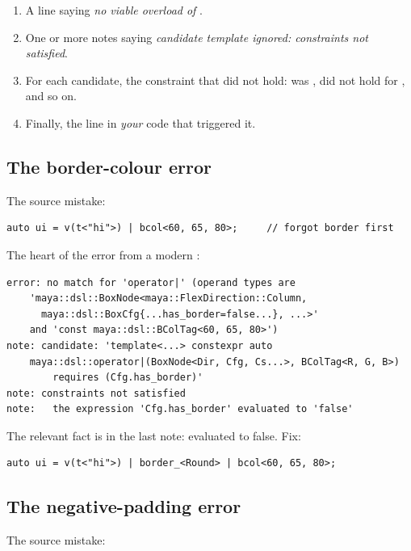 \begin{enumerate}[leftmargin=*]
  \item A line saying \emph{no viable overload of }.
  \item One or more notes saying \emph{candidate template ignored:
    constraints not satisfied}.
  \item For each candidate, the constraint that did not hold:
     was ,  did not
    hold for , and so on.
  \item Finally, the line in \emph{your} code that triggered it.
\end{enumerate}

\subsection{The border-colour error}

The source mistake:

\begin{lstlisting}
auto ui = v(t<"hi">) | bcol<60, 65, 80>;     // forgot border first
\end{lstlisting}

The heart of the error from a modern :

\begin{lstlisting}[style=shell]
error: no match for 'operator|' (operand types are
    'maya::dsl::BoxNode<maya::FlexDirection::Column,
      maya::dsl::BoxCfg{...has_border=false...}, ...>'
    and 'const maya::dsl::BColTag<60, 65, 80>')
note: candidate: 'template<...> constexpr auto
    maya::dsl::operator|(BoxNode<Dir, Cfg, Cs...>, BColTag<R, G, B>)
        requires (Cfg.has_border)'
note: constraints not satisfied
note:   the expression 'Cfg.has_border' evaluated to 'false'
\end{lstlisting}

The relevant fact is in the last note: 
evaluated to false. Fix:

\begin{lstlisting}
auto ui = v(t<"hi">) | border_<Round> | bcol<60, 65, 80>;
\end{lstlisting}

\subsection{The negative-padding error}

The source mistake:

